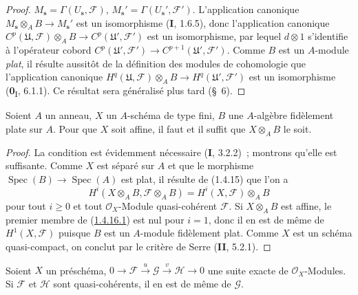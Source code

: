 \begin{proof}
$M_{\mathbf s}=\Gamma(U_{\mathbf s},\mathcal F)$,\quad
$M_{\mathbf s}'=\Gamma(U_{\mathbf s}',\mathcal F')$.
L'application canonique
$M_{\mathbf s}\otimes_A B\to M_{\mathbf s}'$ est un isomorphisme
(\textbf{I}, 1.6.5), donc l'application canonique
$C^p(\mathfrak U,\mathcal F)\otimes_A B\to
C^p(\mathfrak U',\mathcal F')$ est un isomorphisme, par lequel
$d\otimes1$ s'identifie à l'opérateur cobord
$C^p(\mathfrak U',\mathcal F')\to C^{p+1}(\mathfrak U',\mathcal F')$.
Comme $B$ est un $A$-module \emph{plat}, il résulte aussitôt de la définition
des modules de cohomologie que l'application canonique
$H^q(\mathfrak U,\mathcal F)\otimes_A B\to
H^q(\mathfrak U',\mathcal F')$ est un isomorphisme
(\textbf{0}\textsubscript{I}, 6.1.1). Ce résultat sera généralisé plus tard (\S~6).
\end{proof}

\begin{corollary}[1.4.16]
\label{III.1.4.16-fr}
Soient $A$ un anneau, $X$ un $A$-schéma de type fini, $B$ une $A$-algèbre
fidèlement plate sur $A$. Pour que $X$ soit affine, il faut et il suffit que
$X\otimes_A B$ le soit.
\end{corollary}

\begin{proof}
La condition est évidemment nécessaire (\textbf{I}, 3.2.2)~; montrons qu'elle est
suffisante. Comme $X$ est séparé sur $A$ et que le morphisme
$\operatorname{Spec}(B)\to\operatorname{Spec}(A)$ est plat, il résulte de
(1.4.15) que l'on a
\begin{equation}
\label{III.1.4.16.1-fr}
\tag{1.4.16.1}
H^i(X\otimes_A B,\mathcal F\otimes_A B)
=H^i(X,\mathcal F)\otimes_A B
\end{equation}
pour tout $i\geq0$ et tout $\mathcal O_X$-Module quasi-cohérent $\mathcal F$.
Si $X\otimes_A B$ est affine, le premier membre de
(\hyperref[III.1.4.16.1-fr]{1.4.16.1}) est nul pour $i=1$, donc il en est de
même de $H^1(X,\mathcal F)$ puisque $B$ est un $A$-module fidèlement plat.
Comme $X$ est un schéma quasi-compact, on conclut par le critère de Serre
(\textbf{II}, 5.2.1).
\end{proof}

\begin{proposition}[1.4.17]
\label{III.1.4.17-fr}
Soient $X$ un préschéma,
$0\to\mathcal F\xrightarrow{u}\mathcal G\xrightarrow{v}\mathcal H\to0$
une suite exacte de $\mathcal O_X$-Modules. Si $\mathcal F$ et $\mathcal H$
sont quasi-cohérents, il en est de même de $\mathcal G$.
\end{proposition}

